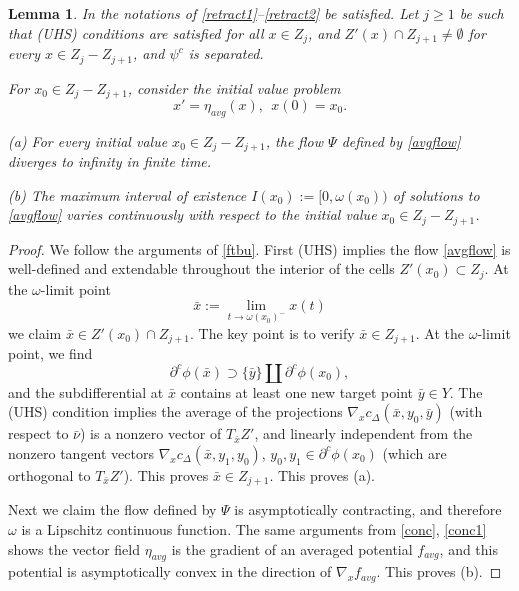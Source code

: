 \documentclass[12pt]{amsart}
\newtheorem{lem}{Lemma}
\theoremstyle{definition}
\theoremstyle{remark}
\newcommand{\del}{\partial}
\newcommand{\cd}{c_\Delta}
\begin{document}
\begin{lem}\label{L;ft}
In the notations of \ref{retract1}--\ref{retract2} be satisfied. Let $j\geq 1$ be such that (UHS) conditions are satisfied for all $x\in Z_j$, and $Z'(x)\cap Z_{j+1}\neq \emptyset$ for every $x\in Z_j - Z_{j+1}$, and $\psi^c$ is separated. 

For $x_0 \in Z_j - Z_{j+1}$, consider the initial value problem \begin{equation}\label{avgflow}
x'=\eta_{avg}(x), ~~x(0)=x_0.
\end{equation}

(a) For every initial value $x_0\in Z_j - Z_{j+1}$, the flow $\Psi$ defined by \eqref{avgflow} diverges to infinity in finite time.

(b) The maximum interval of existence $I(x_0):=[0, \omega(x_0))$ of solutions to \eqref{avgflow} varies continuously with respect to the initial value $x_0\in Z_j-Z_{j+1}$.
\end{lem}

\begin{proof}
We follow the arguments of \ref{ftbu}. First (UHS) implies the flow \eqref{avgflow} is well-defined and extendable throughout the interior of the cells $Z'(x_0)\subset Z_j$. At the $\omega$-limit point $$\bar{x}:=\lim_{t\to \omega(x_0)^-} x(t)$$ we claim $\bar{x}\in Z'(x_0)\cap Z_{j+1}$. The key point is to verify $\bar{x}\in Z_{j+1}$. At the $\omega$-limit point, we find $$\del^c \phi(\bar{x}) \supset \{\bar{y}\} \coprod \del^c \phi(x_0),$$ and the subdifferential at $\bar{x}$ contains at least one new target point $\bar{y} \in Y$. The (UHS) condition implies the average of the projections $\nabla_x \cd(\bar{x}, y_0, \bar{y})$ (with respect to $\bar{\nu}$) is a nonzero vector of $T_{\bar{x}} Z'$, and linearly independent from the nonzero tangent vectors $\nabla_x \cd(\bar{x}, y_1,y_0)$, $y_0, y_1 \in \del^c \phi(x_0)$ (which are orthogonal to $T_{\bar{x}} Z'$). This proves $\bar{x}\in Z_{j+1}$. This proves (a). 

Next we claim the flow defined by $\Psi$ is asymptotically contracting, and therefore $\omega$ is a Lipschitz continuous function. The same arguments from \ref{conc}, \ref{conc1} shows the vector field $\eta_{avg}$ is the gradient of an averaged potential $f_{avg}$, and this potential is asymptotically convex in the direction of $\nabla_x f_{avg}$. This proves (b).

\end{proof}
\end{document}
